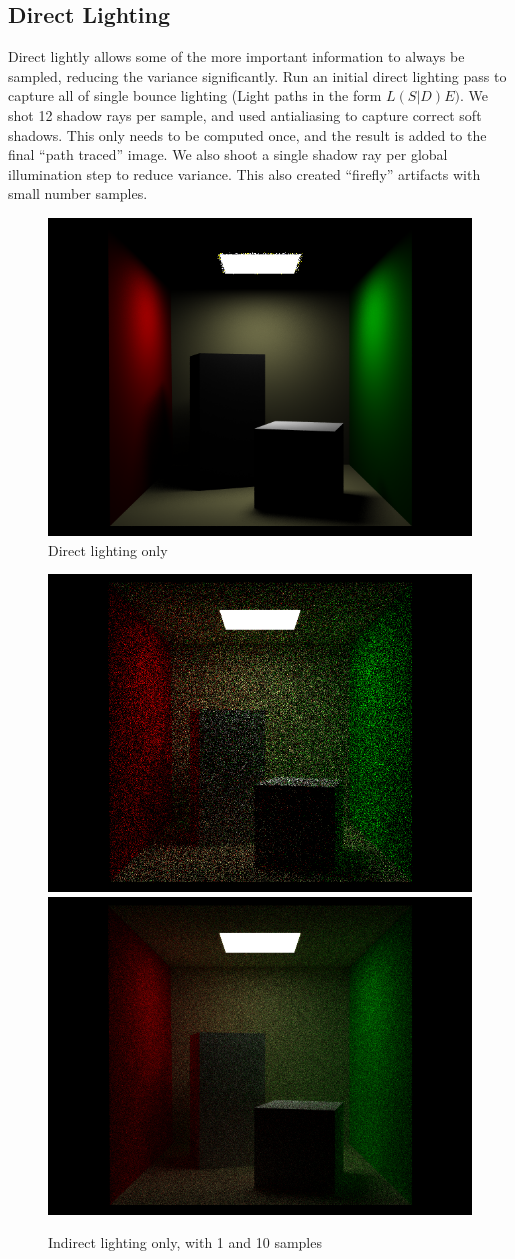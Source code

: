 \documentclass[11pt]{article}
\begin{document}
\subsection{Direct Lighting}
Direct lightly allows some of the more important information to always be sampled, reducing the variance significantly. Run an initial direct lighting pass to capture all of single bounce lighting (Light paths in the form $L(S|D)E)$. We shot 12 shadow rays per sample, and used antialiasing to capture correct soft shadows. This only needs to be computed once, and the result is added to the final ``path traced'' image. We also shoot a single shadow ray per global illumination step to reduce variance. This also created ``firefly'' artifacts with small number samples.

\begin{figure}
  \begin{center}
    \includegraphics[width=.5\linewidth]{figs/direct_only_cornell}
  \end{center}
  \caption{Direct lighting only}
\end{figure}

\begin{figure}
  \begin{center}
  \includegraphics[width=.4\linewidth]{figs/indirect_only_1sample}
  \includegraphics[width=.4\linewidth]{figs/indirect_only_10sample}
  \end{center}
  \caption{Indirect lighting only, with 1 and 10 samples}
\end{figure}
\end{document}
